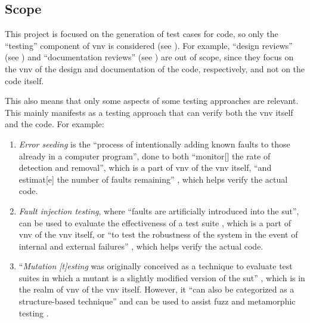 \subsection{Scope}
\label{chap:notes:sec:scope}

This project is focused on the generation of test cases for code, so only
the ``testing'' component of \acf{vnv} is considered (see ).
For example, ``design reviews'' (see \citealp[p.~132]{IEEE2017}) and
``documentation reviews'' (see \citealp[p.~144]{IEEE2017}) are out of scope,
since they focus on the \acs{vnv} of the design and documentation of the code,
respectively, and not on the code itself.

This also means that only some aspects of some testing approaches are relevant.
This mainly manifests as a testing approach that can verify both the \acs{vnv}
itself and the code. For example:

\begin{enumerate}
      \item \emph{Error seeding} is the ``process of intentionally adding
            known faults to those already in a computer program'',
            done to both ``monitor[] the rate of detection and removal'',
            which is a part of \acs{vnv} of the \acs{vnv} itself, ``and
            estimat[e] the number of faults remaining''
            \citep[p.~165]{IEEE2017}, which helps verify the actual code.
      \item \emph{Fault injection testing}, where ``faults are artificially
            introduced into the \acs{sut}'', can be used to evaluate the
            effectiveness of a test suite \citep[p.~5-18]{SWEBOK2024},
            which is a part of \acs{vnv} of the \acs{vnv} itself, or ``to test
            the robustness of the system in the event of internal and
            external failures'' \citep[p.~42]{IEEE2022}, which helps verify
            the actual code.
      \item ``\emph{Mutation [t]esting} was originally conceived as a
            technique to evaluate test suites in which a mutant is a slightly
            modified version of the \acs{sut}'' \citep[p.~5-15]{SWEBOK2024},
            which is in the realm of \acs{vnv} of the \acs{vnv} itself.
            However, it ``can also be categorized as a structure-based
            technique'' and can be used to assist fuzz and metamorphic testing
            \citep[p.~5-15]{SWEBOK2024}.
\end{enumerate}

